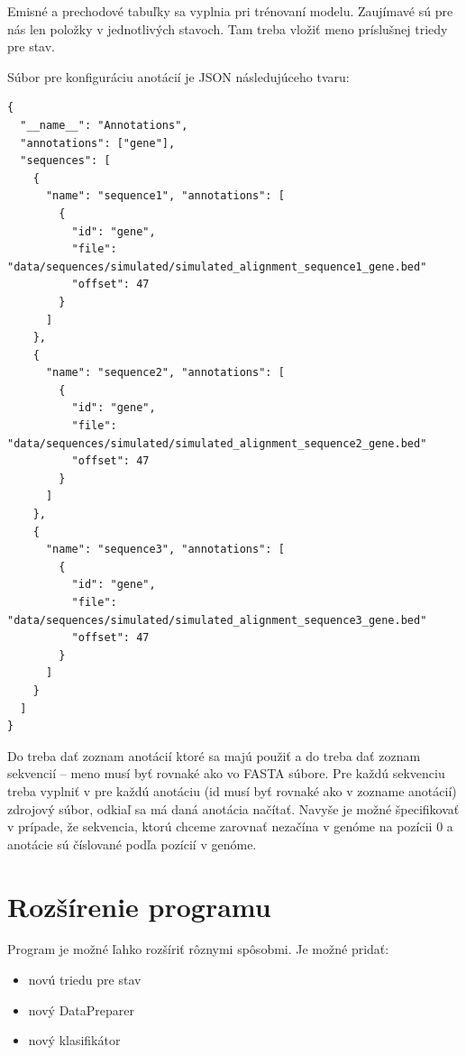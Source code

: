 

Emisné a prechodové tabuľky sa vyplnia pri trénovaní modelu. Zaujímavé sú pre nás len položky  v jednotlivých stavoch. Tam treba vložiť meno príslušnej triedy pre stav.

Súbor pre konfiguráciu anotácií je JSON následujúceho tvaru:
\begin{lstlisting}
{
  "__name__": "Annotations",
  "annotations": ["gene"],
  "sequences": [
    {
      "name": "sequence1", "annotations": [
        {
          "id": "gene",
          "file": "data/sequences/simulated/simulated_alignment_sequence1_gene.bed"
          "offset": 47
        }
      ]
    },
    {
      "name": "sequence2", "annotations": [
        {
          "id": "gene",
          "file": "data/sequences/simulated/simulated_alignment_sequence2_gene.bed"
          "offset": 47
        }
      ]
    },
    {
      "name": "sequence3", "annotations": [
        {
          "id": "gene",
          "file": "data/sequences/simulated/simulated_alignment_sequence3_gene.bed"
          "offset": 47
        }
      ]
    }
  ]
}
\end{lstlisting}
Do  treba dať zoznam anotácií ktoré sa majú použiť a do  treba dať zoznam sekvencií -- meno musí byť rovnaké ako vo FASTA súbore. Pre každú sekvenciu treba vyplniť v  pre každú anotáciu (id musí byť rovnaké ako v zozname anotácií) zdrojový súbor, odkiaľ sa má daná anotácia načítať. Navyše je možné špecifikovať  v prípade, že sekvencia, ktorú chceme zarovnať nezačína v genóme na pozícii 0 a anotácie sú číslované podľa pozícií v genóme.

\section{Rozšírenie programu}

Program je možné ľahko rozšíriť rôznymi spôsobmi. Je možné pridať:
\begin{itemize}
    \item novú triedu pre stav
    \item nový DataPreparer
    \item nový klasifikátor
\end{itemize}

